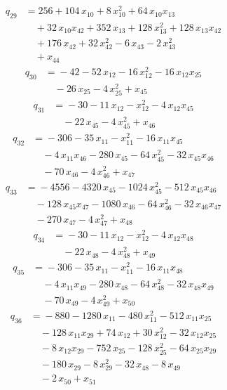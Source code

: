 \begin{align*}
q_{29} &={}256 +104\,x_{10} +8\,x_{10}^{2} +64\,x_{10}x_{13}\\
&\quad +32\,x_{10}x_{42} +352\,x_{13} +128\,x_{13}^{2} +128\,x_{13}x_{42}\\
&\quad +176\,x_{42} +32\,x_{42}^{2} -6\,x_{43} -2\,x_{43}^{2}\\
&\quad +x_{44}
\end{align*}
\begin{align*}
q_{30} &={}-42 -52\,x_{12} -16\,x_{12}^{2} -16\,x_{12}x_{25}\\
&\quad -26\,x_{25} -4\,x_{25}^{2} +x_{45}
\end{align*}
\begin{align*}
q_{31} &={}-30 -11\,x_{12} -x_{12}^{2} -4\,x_{12}x_{45}\\
&\quad -22\,x_{45} -4\,x_{45}^{2} +x_{46}
\end{align*}
\begin{align*}
q_{32} &={}-306 -35\,x_{11} -x_{11}^{2} -16\,x_{11}x_{45}\\
&\quad -4\,x_{11}x_{46} -280\,x_{45} -64\,x_{45}^{2} -32\,x_{45}x_{46}\\
&\quad -70\,x_{46} -4\,x_{46}^{2} +x_{47}
\end{align*}
\begin{align*}
q_{33} &={}-4556 -4320\,x_{45} -1024\,x_{45}^{2} -512\,x_{45}x_{46}\\
&\quad -128\,x_{45}x_{47} -1080\,x_{46} -64\,x_{46}^{2} -32\,x_{46}x_{47}\\
&\quad -270\,x_{47} -4\,x_{47}^{2} +x_{48}
\end{align*}
\begin{align*}
q_{34} &={}-30 -11\,x_{12} -x_{12}^{2} -4\,x_{12}x_{48}\\
&\quad -22\,x_{48} -4\,x_{48}^{2} +x_{49}
\end{align*}
\begin{align*}
q_{35} &={}-306 -35\,x_{11} -x_{11}^{2} -16\,x_{11}x_{48}\\
&\quad -4\,x_{11}x_{49} -280\,x_{48} -64\,x_{48}^{2} -32\,x_{48}x_{49}\\
&\quad -70\,x_{49} -4\,x_{49}^{2} +x_{50}
\end{align*}
\begin{align*}
q_{36} &={}-880 -1280\,x_{11} -480\,x_{11}^{2} -512\,x_{11}x_{25}\\
&\quad -128\,x_{11}x_{29} +74\,x_{12} +30\,x_{12}^{2} -32\,x_{12}x_{25}\\
&\quad -8\,x_{12}x_{29} -752\,x_{25} -128\,x_{25}^{2} -64\,x_{25}x_{29}\\
&\quad -180\,x_{29} -8\,x_{29}^{2} -32\,x_{48} -8\,x_{49}\\
&\quad -2\,x_{50} +x_{51}
\end{align*}
